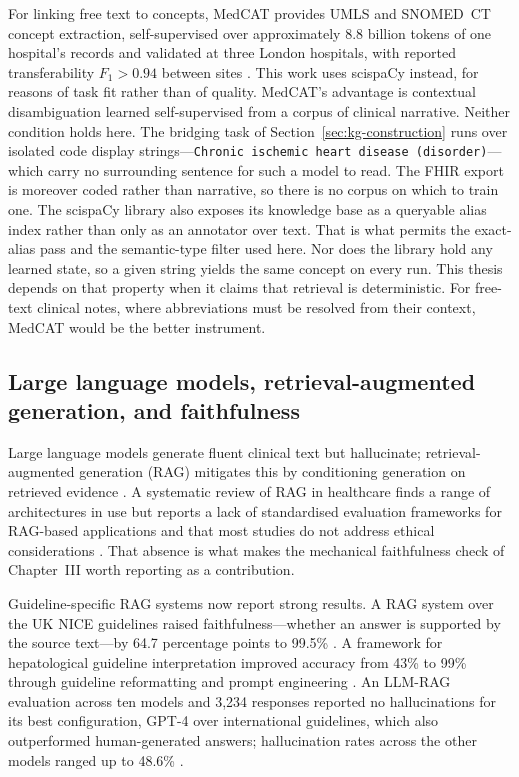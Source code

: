 For linking free text to concepts, MedCAT provides UMLS and SNOMED~CT concept
extraction, self-supervised over approximately 8.8 billion tokens of one hospital's
records and validated at three London hospitals, with reported transferability
$F_1 > 0.94$ between sites \cite{kraljevic2021}. This work
uses scispaCy \cite{scispacy} instead, for reasons of task fit rather than of quality.
MedCAT's advantage is contextual disambiguation learned self-supervised from a corpus of
clinical narrative. Neither condition holds here. The bridging task of
Section~\ref{sec:kg-construction} runs over isolated code display strings---\texttt{Chronic
ischemic heart disease (disorder)}---which carry no surrounding sentence for such a model to
read. The FHIR export is moreover coded rather than narrative, so there is no corpus on
which to train one. The scispaCy library also exposes its knowledge base as a queryable alias index rather than
only as an annotator over text. That is what permits the exact-alias pass and the
semantic-type filter used here. Nor does the library hold any learned state, so a given
string yields the same concept on every run. This thesis depends on that property when it
claims that retrieval is deterministic. For free-text clinical notes, where abbreviations must be resolved from
their context, MedCAT would be the better instrument.

\subsection{Large language models, retrieval-augmented generation, and faithfulness}
Large language models generate fluent clinical text but hallucinate; retrieval-augmented
generation (RAG) mitigates this by conditioning generation on retrieved evidence
\cite{rag_lewis2020}. A systematic review of RAG in healthcare finds a range of
architectures in use but reports a lack of standardised evaluation
frameworks for RAG-based applications and that most studies do not address ethical
considerations \cite{amugongo2025}. That absence is what makes the
mechanical faithfulness check of Chapter~III worth reporting as a contribution.

Guideline-specific RAG systems now report strong results. A RAG system over the UK NICE
guidelines raised faithfulness---whether an answer is supported by the
source text---by 64.7 percentage points to 99.5\%
\cite{lewis2025}. A framework for hepatological guideline interpretation
improved accuracy from 43\% to 99\% through guideline reformatting and
prompt engineering \cite{kresevic2024}. An LLM-RAG evaluation across
ten models and 3{,}234 responses reported no hallucinations for its best
configuration, GPT-4 over international guidelines, which also outperformed
human-generated answers; hallucination rates across the other models ranged up to
48.6\% \cite{ke2025}.

